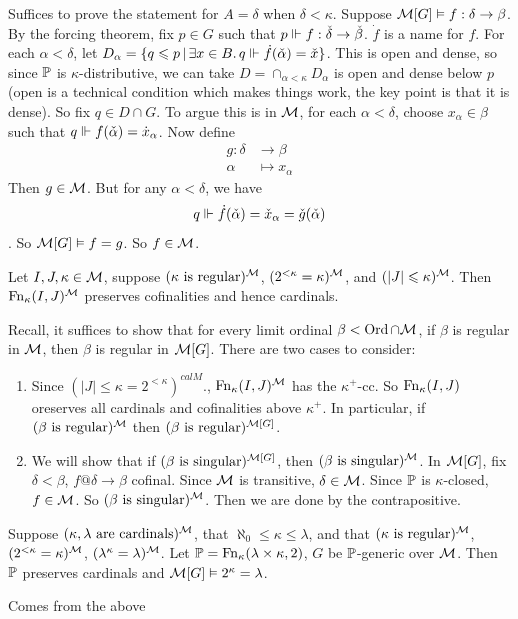 \documentclass{article}
\begin{document}
    \proof Suffices to prove the statement for $A= \delta$ when $\delta < \kappa$. Suppose $\mathcal{M}[G] \vDash f : \delta \to \beta$. By the forcing theorem, fix $p \in G$ such that $p \Vdash f : \check{\delta} \to \check{\beta}$. $\dot{f}$ is a name for $f$.\gap
    For each $\alpha < \delta$, let $D_{\alpha} = \{ q \leqslant p \, | \, \exists x \in B. \, q \Vdash \dot{f}(\check{\alpha}) = \check{x}\}$. This is open and dense, so since $\mathbb{P}$ is $\kappa$-distributive, we can take $D = \cap_{\alpha < \kappa} D_{\alpha}$ is open and dense below $p$ (open is a technical condition which makes things work, the key point is that it is dense). So fix $q \in D \cap G$. To argue this is in $\mathcal{M}$, for each $\alpha < \delta$, choose $x_{\alpha} \in \beta$ such that $q \Vdash f(\check{\alpha}) = \dot{x}_{\alpha}$. Now define \begin{align*}
        g : \delta & \to \beta          \\
        \alpha     & \mapsto x_{\alpha}
    \end{align*}
    Then $g \in \mathcal{M}$. But for any $\alpha < \delta$, we have \[q \Vdash \dot{f}(\check{\alpha})=\check{x}_{\alpha} = \check{g}(\check{\alpha})\]. So $\mathcal{M}[G] \vDash f=g$. So $f \in \mathcal{M}$.
    \endproof
    \begin{fancythm}{}
        Let $I, J, \kappa \in \mathcal{M}$, suppose $(\kappa \text{ is regular})^{\mathcal{M}}$, $(2^{<\kappa}=\kappa)^{\mathcal{M}}$, and $(|J| \leqslant \kappa)^{\mathcal{M}}$. Then $\operatorname{Fn}_{\kappa}(I,J)^{\mathcal{M}}$ preserves cofinalities and hence cardinals.
    \end{fancythm}
    \proof Recall, it suffices to show that for every limit ordinal $\beta < \operatorname{Ord} \cap \mathcal{M}$, if $\beta$ is regular in $\mathcal{M}$, then $\beta$ is regular in $\mathcal{M}[G]$. There are two cases to consider: \begin{enumerate}
        \item[($\beta > \kappa$)] Since $(|J| \leq \kappa = 2^{<\kappa})^{calM}$., $\operatorname{Fn}_{\kappa}(I,J)^{\mathcal{M}}$ has the $\kappa^{+}$-cc. So $\operatorname{Fn}_{\kappa}(I,J)$ oreserves all cardinals and cofinalities above $\kappa^{+}$. In particular, if $(\beta \text{ is regular})^{\mathcal{M}}$ then $(\beta \text{ is regular})^{\mathcal{M}[G]}$.
        \item[$(\beta \leq \kappa)$] We will show that if $(\beta \text{ is singular})^{\mathcal{M}[G]}$, then $(\beta \text{ is singular})^{\mathcal{M}}$. In $\mathcal{M}[G]$, fix $\delta < \beta$, $f@ \delta \to \beta$ cofinal. Since $\mathcal{M}$ is transitive, $\delta \in \mathcal{M}$. Since $\mathbb{P}$ is $\kappa$-closed, $f \in \mathcal{M}$. So $(\beta \text{ is singular})^{\mathcal{M}}$. Then we are done by the contrapositive.
    \end{enumerate}
    \endproof
    \begin{fancythm}{}
        Suppose $(\kappa, \lambda \text{ are cardinals})^{\mathcal{M}}$, that $\aleph_{0} \leq \kappa \leq \lambda$, and that $(\kappa \text{ is regular})^{\mathcal{M}}$, $(2^{<\kappa}=\kappa)^{\mathcal{M}}$, $(\lambda^{\kappa} = \lambda)^{\mathcal{M}}$. Let $\mathbb{P} = \operatorname{Fn}_{\kappa}(\lambda \times \kappa, 2)$, $G$ be $\mathbb{P}$-generic over $\mathcal{M}$. Then $\mathbb{P}$ preserves cardinals and $\mathcal{M}[G] \vDash 2^{\kappa} = \lambda$.
    \end{fancythm}
    \proof Comes from the above \endproof
\end{document}
